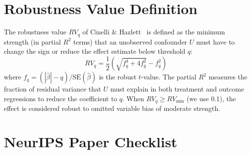 \documentclass{article}
\begin{document}
\section{Robustness Value Definition}
\label{sec:rv-definition}

The robustness value $RV_q$ of Cinelli \& Hazlett~\cite{cinelli2020}
is defined as the minimum strength (in partial $R^2$ terms) that an
unobserved confounder $U$ must have to change the sign or reduce the
effect estimate below threshold $q$:
\begin{equation}
  RV_q = \frac{1}{2}\left(\sqrt{f_q^4 + 4f_q^2} - f_q^2\right)
\end{equation}
where $f_q = (|\hat{\beta}| - q) / \text{SE}(\hat{\beta})$ is the
robust $t$-value. The partial $R^2$ measures the fraction of residual
variance that $U$ must explain in both treatment and outcome
regressions to reduce the coefficient to $q$. When
$RV_q \geq RV_{\min}$ (we use 0.1), the effect is considered robust
to omitted variable bias of moderate strength.


\section{NeurIPS Paper Checklist}
\label{sec:checklist}
\end{document}
